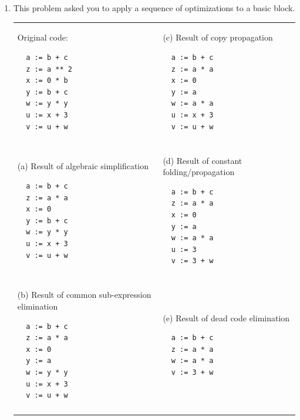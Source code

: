 \documentclass{article}
\begin{document}

\begin{enumerate}
\item This problem asked you to apply a sequence of optimizations to a
basic block.

\begin{tabular}{|l|l|} \hline
\begin{minipage}[t]{3in}
Original code:
\begin{verbatim}
  a := b + c
  z := a ** 2
  x := 0 * b
  y := b + c
  w := y * y
  u := x + 3
  v := u + w
\end{verbatim}
\end{minipage}
&
\begin{minipage}[t]{3in}
(c) Result of copy propagation
\begin{verbatim}
  a := b + c
  z := a * a
  x := 0
  y := a
  w := a * a
  u := x + 3
  v := u + w
\end{verbatim}
\end{minipage}
\\ & \\ \hline
\begin{minipage}[t]{3in}
(a) Result of algebraic simplification
\begin{verbatim}
  a := b + c
  z := a * a
  x := 0
  y := b + c
  w := y * y
  u := x + 3
  v := u + w
\end{verbatim}
\end{minipage}
&
\begin{minipage}[t]{3in}
(d) Result of constant folding/propagation
\begin{verbatim}
  a := b + c
  z := a * a
  x := 0
  y := a
  w := a * a
  u := 3
  v := 3 + w
\end{verbatim}
\end{minipage}
\\ & \\ \hline
\begin{minipage}[t]{3in}
(b) Result of common sub-expression elimination
\begin{verbatim}
  a := b + c
  z := a * a
  x := 0
  y := a
  w := y * y
  u := x + 3
  v := u + w
\end{verbatim}
\end{minipage}
&
\begin{minipage}[t]{3in}
(e) Result of dead code elimination
\begin{verbatim}
  a := b + c
  z := a * a
  w := a * a
  v := 3 + w
\end{verbatim}
\end{minipage}
\\ & \\
\hline
\end{tabular}


\end{enumerate}
\end{document}
